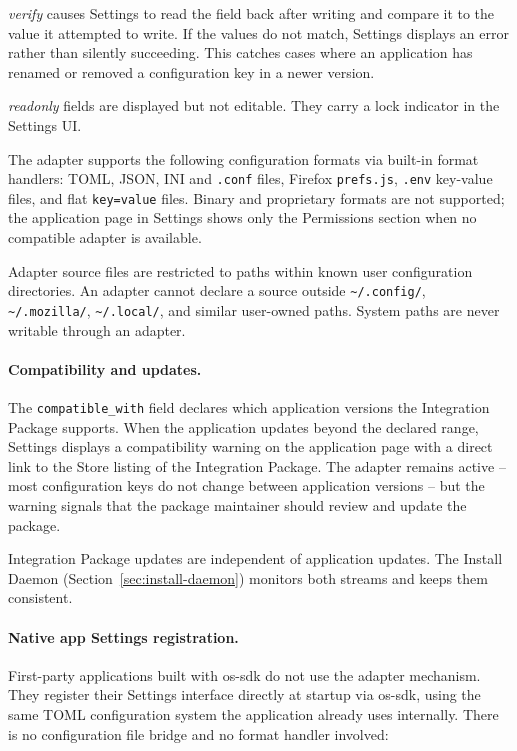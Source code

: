 \emph{verify} causes Settings to read the field back after writing and compare
it to the value it attempted to write. If the values do not match, Settings
displays an error rather than silently succeeding. This catches cases where an
application has renamed or removed a configuration key in a newer version.

\emph{readonly} fields are displayed but not editable. They carry a lock
indicator in the Settings UI.

The adapter supports the following configuration formats via built-in format
handlers: TOML, JSON, INI and \texttt{.conf} files, Firefox \texttt{prefs.js},
\texttt{.env} key-value files, and flat \texttt{key=value} files. Binary and
proprietary formats are not supported; the application page in Settings shows
only the Permissions section when no compatible adapter is available.

Adapter source files are restricted to paths within known user configuration
directories. An adapter cannot declare a source outside \texttt{\textasciitilde/.config/},
\texttt{\textasciitilde/.mozilla/}, \texttt{\textasciitilde/.local/}, and
similar user-owned paths. System paths are never writable through an adapter.

\paragraph{Compatibility and updates.}
The \texttt{compatible\_with} field declares which application versions the
Integration Package supports. When the application updates beyond the declared
range, Settings displays a compatibility warning on the application page with
a direct link to the Store listing of the Integration Package. The adapter
remains active -- most configuration keys do not change between application
versions -- but the warning signals that the package maintainer should review
and update the package.

Integration Package updates are independent of application updates. The Install
Daemon (Section~\ref{sec:install-daemon}) monitors both streams and keeps
them consistent.

\paragraph{Native app Settings registration.}
First-party applications built with os-sdk do not use the adapter mechanism.
They register their Settings interface directly at startup via os-sdk, using
the same TOML configuration system the application already uses internally.
There is no configuration file bridge and no format handler involved:

